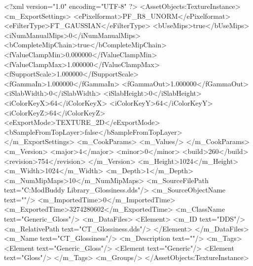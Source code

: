<?xml version="1.0" encoding="UTF-8" ?>
<AssetObjects:TextureInstance>
	<m_ExportSettings>
		<ePixelformat>PF_R8_UNORM</ePixelformat>
		<eFilterType>FT_GAUSSIAN</eFilterType>
		<bUseMips>true</bUseMips>
		<iNumManualMips>0</iNumManualMips>
		<bCompleteMipChain>true</bCompleteMipChain>
		<fValueClampMin>0.000000</fValueClampMin>
		<fValueClampMax>1.000000</fValueClampMax>
		<fSupportScale>1.000000</fSupportScale>
		<fGammaIn>1.000000</fGammaIn>
		<fGammaOut>1.000000</fGammaOut>
		<iSlabWidth>0</iSlabWidth>
		<iSlabHeight>0</iSlabHeight>
		<iColorKeyX>64</iColorKeyX>
		<iColorKeyY>64</iColorKeyY>
		<iColorKeyZ>64</iColorKeyZ>
		<eExportMode>TEXTURE_2D</eExportMode>
		<bSampleFromTopLayer>false</bSampleFromTopLayer>
	</m_ExportSettings>
	<m_CookParams>
		<m_Values/>
	</m_CookParams>
	<m_Version>
		<major>4</major>
		<minor>0</minor>
		<build>260</build>
		<revision>754</revision>
	</m_Version>
	<m_Height>1024</m_Height>
	<m_Width>1024</m_Width>
	<m_Depth>1</m_Depth>
	<m_NumMipMaps>10</m_NumMipMaps>
	<m_SourceFilePath text="C:\Users\Furion\Documents\Firaxis ModBuddy Library\UnfoldedMaps\CT_Glossiness.dds"/>
	<m_SourceObjectName text=""/>
	<m_ImportedTime>0</m_ImportedTime>
	<m_ExportedTime>3274280602</m_ExportedTime>
	<m_ClassName text="Generic_Gloss"/>
	<m_DataFiles>
		<Element>
			<m_ID text="DDS"/>
			<m_RelativePath text="CT_Glossiness.dds"/>
		</Element>
	</m_DataFiles>
	<m_Name text="CT_Glossiness"/>
	<m_Description text=""/>
	<m_Tags>
		<Element text="Generic_Gloss"/>
		<Element text="Generic"/>
		<Element text="Gloss"/>
	</m_Tags>
	<m_Groups/>
</AssetObjects:TextureInstance>

 